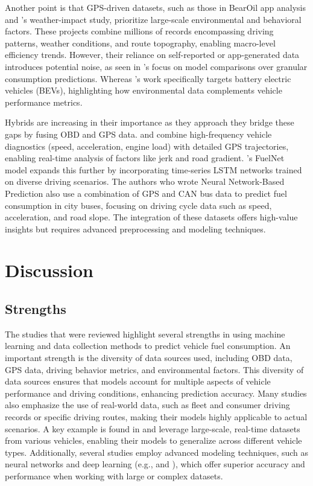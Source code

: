 \documentclass[letterpaper]{article}
\begin{document}
Another point is that GPS-driven datasets, such as those in \cite{yang2022predicting} BearOil 
app analysis and \cite{filla2025using}'s weather-impact study, prioritize large-scale 
environmental and behavioral factors. These projects combine millions of records encompassing
driving patterns, weather conditions, and route topography, enabling macro-level efficiency 
trends. However, their reliance on self-reported or app-generated data introduces potential 
noise, as seen in \cite{yang2022predicting}'s focus on model comparisons over granular 
consumption predictions. Whereas \cite{filla2025using}'s work specifically targets battery 
electric vehicles (BEVs), highlighting how environmental data complements vehicle performance 
metrics. 

Hybrids are increasing in their importance as they approach they bridge these gaps by fusing
OBD and GPS data. \cite{zhang2023novel} and \cite{yen_combining_2021} combine high-frequency 
vehicle diagnostics (speed, acceleration, engine load) with detailed GPS trajectories,
enabling real-time analysis of factors like jerk and road gradient. \cite{wang2020fuelnet}'s 
FuelNet model expands this further by incorporating time-series LSTM networks trained on 
diverse driving scenarios. The authors who wrote Neural Network-Based Prediction also use a 
combination of GPS and CAN bus data to predict fuel consumption in city buses, focusing on 
driving cycle data such as speed, acceleration, and road slope. The integration of these 
datasets offers high-value insights but requires advanced preprocessing and modeling techniques.

\section*{Discussion}

\subsection*{Strengths}

The studies that were reviewed highlight several strengths in using machine learning and data 
collection methods to predict vehicle fuel consumption. An important strength is the diversity 
of data sources used, including OBD data, GPS data, driving behavior metrics, and environmental 
factors. This diversity of data sources ensures that models account for multiple aspects of 
vehicle performance and driving conditions, enhancing prediction accuracy. Many studies also 
emphasize the use of real-world data, such as fleet and consumer driving records or specific 
driving routes, making their models highly applicable to actual scenarios. A key example is 
found in \cite{yang2022predicting} and \cite{abukhalil2020fuel} leverage large-scale, 
real-time datasets from various vehicles, enabling their models to generalize across different 
vehicle types. Additionally, several studies employ advanced modeling techniques, such as 
neural networks and deep learning (e.g., \cite{yen_combining_2021} and \cite{wang2020fuelnet}), 
which offer superior  accuracy and performance when working with large or complex datasets.
\end{document}
